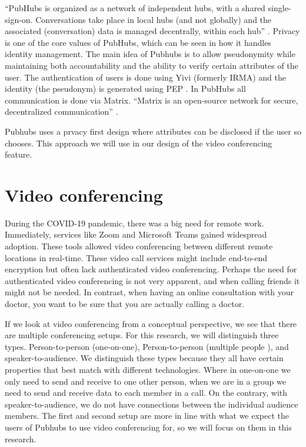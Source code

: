 \documentclass{report}
\begin{document}
    “PubHubs is organized as a network of independent hubs, with a shared single-sign-on. Conversations take place in
    local hubs (and not globally) and the associated (conversation) data is managed decentrally, within each hub”
    \cite{jacobs_pubhubs_2023}
    . Privacy is one of the core values of PubHubs, which can be seen in how it handles identity management. The main
    idea of Pubhubs is to allow pseudonymity while maintaining both accountability and the ability to verify certain
    attributes of the user. The authentication of users is done using Yivi (formerly IRMA)\cite{alpar_irma_nodate}
    and the identity (the pseudonym) is generated using PEP \cite{verheul_polymorphic_2016}
    . In PubHubs all communication is done via Matrix. “Matrix is an open-source network for secure, decentralized
    communication” \cite{noauthor_matrixorg_nodate}.

    Pubhubs uses a prvacy first design where attributes can be disclosed if the user so chooses. This approach we will
    use in our design of the video conferencing feature.


    \section{Video conferencing}
    During the COVID-19 pandemic, there was a big need for remote work. Immediately, services like Zoom \cite{Zoom}
    and Microsoft Teams  \cite{MSTeams}
    gained widespread adoption. These tools allowed video conferencing between different remote locations in real-time.
    These video call services might include end-to-end encryption but often lack authenticated video conferencing.
    Perhaps the need for authenticated video conferencing is not very apparent, and when calling friends it might not be
    needed. In contrast, when having an online consultation with your doctor, you want to be sure that you are actually
    calling a doctor.


    If we look at video conferencing from a conceptual perspective, we see that there are multiple conferencing setups.
    For this research, we will distinguish three types. Person-to-person (one-on-one), Person-to-person (multiple people
    ), and speaker-to-audience. We distinguish these types because they all have certain properties that best match with
    different technologies. Where in one-on-one we only need to send and receive to one other person, when we are in a
    group we need to send and receive data to each member in a call. On the contrary, with speaker-to-audience, we do
    not have connections between the individual audience members. The first and second setup are more in line with what
    we expect the users of Pubhubs to use video conferencing for, so we will focus on them in this research.
\end{document}

